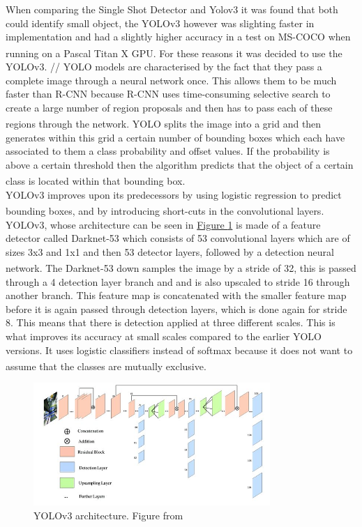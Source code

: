 \documentclass[11pt]{article}		%
\newcommand{\supercite}[1]{\textsuperscript{\cite{#1}}}		%
\newcommand{\figref}[1]{\hyperref[#1]{Figure \ref*{#1}}}    %
\begin{document}
	        When comparing the Single Shot Detector and Yolov3 it was found that both could identify small object,  
	        the YOLOv3 however was slighting faster in implementation and had a slightly higher accuracy in a test on MS-COCO when running on a Pascal Titan X GPU.\supercite{YOLO} For these reasons it was decided to use the YOLOv3.
	        //
	        YOLO models are characterised by the fact that they pass a complete image through a neural network once. This allows them to be much faster than R-CNN because R-CNN uses time-consuming selective search to create a large number of region proposals and then has to pass each of these regions through the network.\supercite{YOLO2} \supercite{R-CNN} YOLO splits the image into a grid and then generates within this grid a certain number of bounding boxes which each have associated to them a class probability and offset values. If the probability is above a certain threshold then the algorithm predicts that the object of a certain class is located within that bounding box.\supercite{Object_detection} 
	        \\
	        YOLOv3 improves upon its predecessors by using logistic regression to predict bounding boxes,\supercite{YOLOV3} and  by introducing short-cuts in the convolutional layers.
	        YOLOv3, whose architecture can be seen in \figref{YOLOv3_image} is made of a feature detector called Darknet-53 which consists of 53 convolutional layers which are of sizes 3x3 and 1x1 and then 53 detector layers, followed by a detection neural network. \supercite{YOLOV3}
	        The Darknet-53 down samples the image by a stride of 32, this is passed through a 4 detection layer branch and and is also upscaled to stride 16 through another branch. This feature map is concatenated with the smaller feature map before it is again passed through detection layers, which is done again for stride 8. This means that there is detection applied at three different scales. This is what improves its accuracy at small scales compared to the earlier YOLO versions. It uses logistic classifiers instead of softmax because it does not want to assume that the classes are mutually exclusive.\supercite{YOLOV3} 
	        	\begin{figure}[h]
				\centering
				\includegraphics[width=0.8\textwidth]{Network-architecture-of-YOLOv3_W640.jpg}
				\caption{YOLOv3 architecture. Figure from \cite{YOLOv3_image}}
				\label{YOLOv3_image}
			\end{figure}
\end{document}
